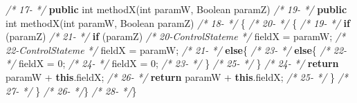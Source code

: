\documentclass[
]{article}
\newenvironment{Shaded}{\begin{snugshade}}{\end{snugshade}}
\newcommand{\BuiltInTok}[1]{#1}
\newcommand{\CommentTok}[1]{\textcolor[rgb]{0.56,0.35,0.01}{\textit{#1}}}
\newcommand{\DataTypeTok}[1]{\textcolor[rgb]{0.13,0.29,0.53}{#1}}
\newcommand{\DecValTok}[1]{\textcolor[rgb]{0.00,0.00,0.81}{#1}}
\newcommand{\FunctionTok}[1]{\textcolor[rgb]{0.00,0.00,0.00}{#1}}
\newcommand{\KeywordTok}[1]{\textcolor[rgb]{0.13,0.29,0.53}{\textbf{#1}}}
\newcommand{\NormalTok}[1]{#1}
\begin{document}
\begin{landscape}
\begin{Shaded}
\begin{Highlighting}[]
\CommentTok{/* 17-                 */}    \KeywordTok{public} \DataTypeTok{int} \FunctionTok{methodX}\NormalTok{(}\DataTypeTok{int}\NormalTok{ paramW, }\BuiltInTok{Boolean}\NormalTok{ paramZ)             }\CommentTok{/* 19-                 */}    \KeywordTok{public} \DataTypeTok{int} \FunctionTok{methodX}\NormalTok{(}\DataTypeTok{int}\NormalTok{ paramW, }\BuiltInTok{Boolean}\NormalTok{ paramZ)             }
\CommentTok{/* 18-                 */}\NormalTok{    \{                                                          }\CommentTok{/* 20-                 */}\NormalTok{    \{                                                          }
\CommentTok{/* 19-                 */}        \KeywordTok{if}\NormalTok{ (paramZ)                                            }\CommentTok{/* 21-                 */}        \KeywordTok{if}\NormalTok{ (paramZ)                                            }
\CommentTok{/* 20-ControlStateme   */}\NormalTok{            fieldX = paramW;                                   }\CommentTok{/* 22-ControlStateme   */}\NormalTok{            fieldX = paramW;                                   }
\CommentTok{/* 21-                 */}        \KeywordTok{else}\NormalTok{\{                                                  }\CommentTok{/* 23-                 */}        \KeywordTok{else}\NormalTok{\{                                                  }
\CommentTok{/* 22-                 */}\NormalTok{            fieldX = }\DecValTok{0}\NormalTok{;                                        }\CommentTok{/* 24-                 */}\NormalTok{            fieldX = }\DecValTok{0}\NormalTok{;                                        }
\CommentTok{/* 23-                 */}\NormalTok{       \}                                                       }\CommentTok{/* 25-                 */}\NormalTok{        \}                                                              }
\CommentTok{/* 24-                 */}        \KeywordTok{return}\NormalTok{ paramW + }\KeywordTok{this}\NormalTok{.}\FunctionTok{fieldX}\NormalTok{;                           }\CommentTok{/* 26-                 */}        \KeywordTok{return}\NormalTok{ paramW + }\KeywordTok{this}\NormalTok{.}\FunctionTok{fieldX}\NormalTok{;          }
\CommentTok{/* 25-                 */}\NormalTok{     \}                                                         }\CommentTok{/* 27-                 */}\NormalTok{     \}                                                         }
\CommentTok{/* 26-                 */}\NormalTok{\}                                                              }\CommentTok{/* 28-                 */}\NormalTok{\}                                                              }
\end{Highlighting}
\end{Shaded}


\end{landscape}
\end{document}
